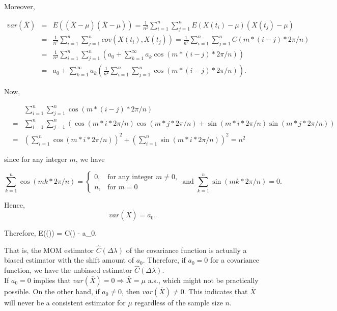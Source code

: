Moreover,

\begin{eqnarray*}
	\nonumber
	var(\bar{X}) &=& E((\bar{X} - \mu)(\bar{X} - \mu)) = \frac{1}{n^2}\sum_{i = 1}^n \sum_{j=1}^n E(X(t_i) - \mu)(X(t_j) - \mu) \\ \nonumber
	&=&  \frac{1}{n^2}\sum_{i = 1}^n \sum_{j=1}^n cov(X(t_i), X(t_j)) = \frac{1}{n^2}\sum_{i = 1}^n \sum_{j=1}^n C(m*(i-j)*2\pi/n) \\ \nonumber
	&=& \frac{1}{n^2}\sum_{i = 1}^n \sum_{j=1}^n \left(a_0 + \sum_{k=1}^\infty a_k \cos(m*(i-j)*2\pi/n)\right) \\ \nonumber
	&=& a_0 + \sum_{k=1}^\infty a_k \left(\frac{1}{n^2}\sum_{i = 1}^n \sum_{j=1}^n \cos(m*(i-j)*2\pi/n)\right).
\end{eqnarray*}

Now,

\begin{eqnarray*}
	& & \sum_{i = 1}^n \sum_{j=1}^n \cos(m*(i-j)*2\pi/n) \\
	&=& \sum_{i=1}^n \sum_{j=1}^n \left(\cos(m*i *2\pi/n)\cos(m*j*2\pi/n) + \sin(m*i *2\pi/n)\sin(m*j*2\pi/n) \right)\\
	&=& \left(\sum_{i=1}^n \cos(m*i *2\pi/n)\right)^2 + \left(\sum_{i=1}^n \sin(m*i *2\pi/n)\right)^2 = n^2
\end{eqnarray*}

since for any integer $m$, we have

\[
	\sum_{k = 1}^{n} \cos(mk*2\pi/n) = \left\{\begin{array}{cc}
	0, & \mbox{for any integer $m \ne 0$,}  \\
	n, & \mbox{for $m = 0$}
	\end{array}
	\right. \mbox{ and }
	\sum_{k = 1}^{n} \sin(mk*2\pi/n) = 0.
\]

Hence,
\[
	var(\bar{X}) = a_0.
\]

Therefore,
\beq
E((\Delta \lambda)) = C(\Delta \lambda) - a_0.
\eeq

That is, the MOM estimator $\hat{C}(\Delta \lambda)$ of the covariance function is actually a biased estimator with the shift amount of $a_0$. Therefore, if $a_0 = 0$ for a covariance function, we have the unbiased estimator $\hat{C}(\Delta \lambda)$. \\

If $a_0 = 0$ implies that $var(\bar{X}) = 0 \Rightarrow \bar{X} = \mu$ a.s., which might not be practically possible. On the other hand, if $a_0 \ne 0$, then $var(\bar{X}) \ne 0$. This indicates that $\bar{X}$ will never be a consistent estimator for $\mu$ regardless of the sample size $n$.\\

